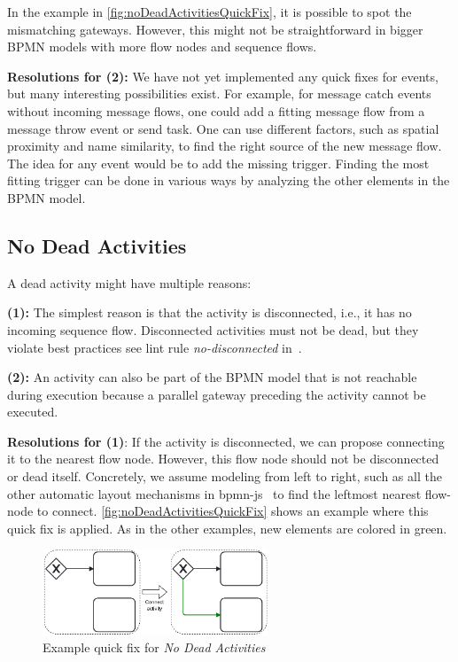 \documentclass[runningheads]{llncs}
\begin{document}
In the example in \autoref{fig:noDeadActivitiesQuickFix}, it is possible to spot the mismatching gateways.
However, this might not be straightforward in bigger BPMN models with more flow nodes and sequence flows.

\textbf{Resolutions for (2):} We have not yet implemented any quick fixes for events, but many interesting possibilities exist.
For example, for message catch events without incoming message flows, one could add a fitting message flow from a message throw event or send task.
One can use different factors, such as spatial proximity and name similarity, to find the right source of the new message flow.
The idea for any event would be to add the missing trigger.
Finding the most fitting trigger can be done in various ways by analyzing the other elements in the BPMN model.


\subsection{No Dead Activities}
A dead activity might have multiple reasons:

\textbf{(1):} The simplest reason is that the activity is disconnected, i.e., it has no incoming sequence flow.
Disconnected activities must not be dead, but they violate best practices see lint rule \textit{no-disconnected} in~\cite{camundaservicesgmbhBpmnlint2024}.

\textbf{(2):} An activity can also be part of the BPMN model that is not reachable during execution because a parallel gateway preceding the activity cannot be executed.

\textbf{Resolutions for (1)}: If the activity is disconnected, we can propose connecting it to the nearest flow node.
However, this flow node should not be disconnected or dead itself.
Concretely, we assume modeling from left to right, such as all the other automatic layout mechanisms in bpmn-js~\cite{camundaservicesgmbhBpmnjs2024} to find the leftmost nearest flow-node to connect.
\autoref{fig:noDeadActivitiesQuickFix} shows an example where this quick fix is applied.
As in the other examples, new elements are colored in green.

\begin{figure}[ht]
	\centering
	\includegraphics[width=0.6\textwidth]{images/dead}
	\caption{Example quick fix for \textit{No Dead Activities}}
	\label{fig:noDeadActivitiesQuickFix}
\end{figure}
\end{document}
